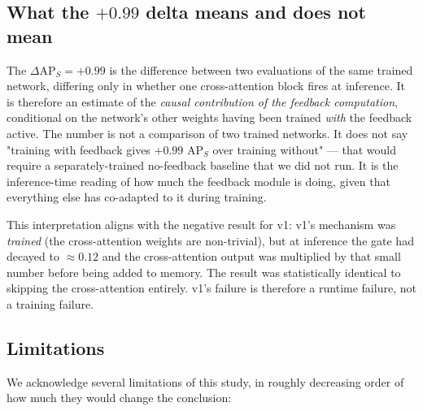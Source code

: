 \subsection{What the $+0.99$ delta means and does not mean}

The $\Delta\mathrm{AP}_S = +0.99$ is the difference between two evaluations of the same trained network, differing only in whether one cross-attention block fires at inference. It is therefore an estimate of the \emph{causal contribution of the feedback computation}, conditional on the network's other weights having been trained \emph{with} the feedback active. The number is not a comparison of two trained networks. It does not say "training with feedback gives $+0.99$ AP$_S$ over training without" --- that would require a separately-trained no-feedback baseline that we did not run. It is the inference-time reading of how much the feedback module is doing, given that everything else has co-adapted to it during training.

This interpretation aligns with the negative result for v1: v1's mechanism was \emph{trained} (the cross-attention weights are non-trivial), but at inference the gate had decayed to ${\approx}0.12$ and the cross-attention output was multiplied by that small number before being added to memory. The result was statistically identical to skipping the cross-attention entirely. v1's failure is therefore a runtime failure, not a training failure.

\subsection{Limitations}
\label{sec:limitations}

We acknowledge several limitations of this study, in roughly decreasing order of how much they would change the conclusion:

